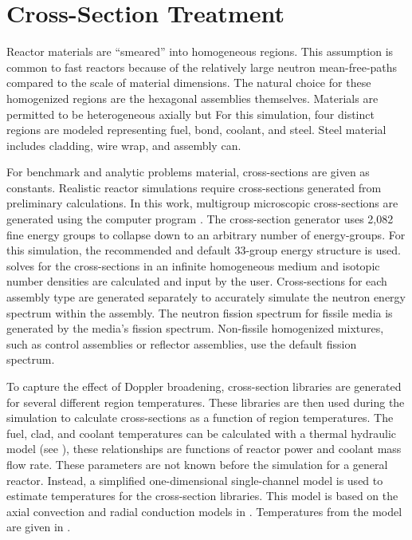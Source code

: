 \section{Cross-Section Treatment}
  \label{sec:cross_section_treatment}
  Reactor materials are ``smeared'' into homogeneous regions. This assumption is 
  common to fast reactors because of the relatively large neutron 
  mean-free-paths compared to the scale of material dimensions. 
  The natural choice for these homogenized regions are the hexagonal
  assemblies themselves. Materials are permitted to be heterogeneous axially but
  For this simulation, four distinct regions are modeled representing fuel, 
  bond, coolant, and steel. Steel material includes cladding, wire wrap, and 
  assembly can. 

  For benchmark and analytic problems material, cross-sections are given as
  constants. Realistic reactor simulations require
  cross-sections generated from preliminary calculations. In this
  work, multigroup microscopic cross-sections are generated using the computer
  program \mcc \cite{mcc}.
  The cross-section generator uses 2,082 fine energy groups to collapse down
  to an arbitrary number of energy-groups. For this simulation, the
  recommended and default 33-group energy structure is used. \mcc 
  solves for the cross-sections in an infinite homogeneous medium and isotopic 
  number densities are calculated and input by the user.
  Cross-sections for each assembly type are generated separately to accurately
  simulate the neutron energy spectrum within the assembly. The neutron fission  
  spectrum for fissile media is generated by the media's fission spectrum. 
  Non-fissile homogenized mixtures, such as control assemblies or reflector
  assemblies, use the default  fission spectrum. 

  To capture the effect of Doppler broadening, cross-section libraries are
  generated for several different region temperatures. These libraries are
  then used during the simulation to calculate cross-sections as a function of 
  region temperatures.
  The fuel, clad, and coolant temperatures can be calculated with a thermal
  hydraulic model (see ), these relationships are 
  functions of reactor power and coolant mass flow rate. These parameters are
  not known before the simulation for a general reactor. Instead, a simplified
  one-dimensional single-channel model is used to estimate temperatures for the
  cross-section libraries. This model is based on the axial convection and
  radial conduction models in . Temperatures from
  the model are given in .

